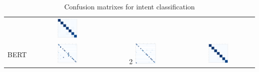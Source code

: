 \documentclass[a4paper]{article}
\begin{document}
\begin{table}[h!]
\begin{adjustbox}{max width=\textwidth}
\begin{tabular}{l|ccc}
			&\includegraphics[width=0.3\textwidth]{"../assets/images/confusion matrixes/CM_BiLSTM_intent_SNIPS_labeless"} \\
			\cmidrule{1-4}
			BERT &  \includegraphics[width=0.3\textwidth]{"../assets/images/confusion matrixes/CM_BERT_intent_ATIS_labeless"} &2 \includegraphics[width=0.3\textwidth]{"../assets/images/confusion matrixes/CM_BERT_intent_remix_ATIS_labeless"} &\includegraphics[width=0.3\textwidth]{"../assets/images/confusion matrixes/CM_BERT_intent_SNIPS_labeless"} \\
		\end{tabular}
	\end{adjustbox}
\caption{Confusion matrixes for intent classification}
\label{fig:cm_intent}
\end{table}
\end{document}
